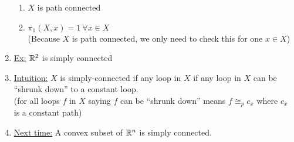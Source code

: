 \begin{enumerate}
\begin{enumerate}
                \item $X$ is path connected
                \item $\pi_1(X,x)={1}\ \forall x\in X$\\
                    (Because $X$ is path connected, we only need to check this for one $x\in X$)
            \end{enumerate}
        \item \underline{Ex:} $\mathbb{R}^2$ is simply connected
        \item \underline{Intuition:} $X$ is simply-connected if any loop in $X$ if any loop in $X$ can
            be ``shrunk down'' to a constant loop.\\
            (for all loops $f$ in $X$ saying $f$ can be ``shrunk down'' means $f\cong_{p}c_x$ where $c_x$ is a constant path)
        \item \underline{Next time:} A convex subset of $\mathbb{R}^n$ is simply connected.
    \end{enumerate}
